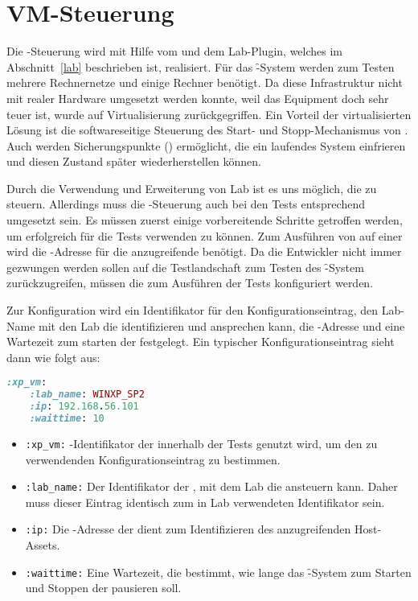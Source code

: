 \section{VM-Steuerung}
\label{sec:test_vm_control}
\authors{\DH \and \LM}{\MW \and \JF}

Die -Steuerung wird mit Hilfe vom 
und dem Lab-Plugin, welches im Abschnitt~\ref{lab} beschrieben ist,
realisiert. Für das \f-System werden zum Testen mehrere
Rechnernetze und einige Rechner benötigt. Da diese Infrastruktur nicht
mit realer Hardware umgesetzt werden konnte, weil das Equipment doch
sehr teuer ist, wurde auf Virtualisierung zurückgegriffen. Ein Vorteil
der virtualisierten Lösung ist die softwareseitige Steuerung des
Start- und Stopp-Mechanismus von . Auch werden
Sicherungspunkte () ermöglicht, die ein laufendes System
einfrieren und diesen Zustand später wiederherstellen können.

Durch die Verwendung und Erweiterung von Lab ist es uns möglich, die 
zu steuern. Allerdings muss die -Steuerung auch bei den Tests
entsprechend umgesetzt sein. Es müssen zuerst einige vorbereitende Schritte
getroffen werden, um  erfolgreich für die Tests verwenden zu können. 
Zum Ausführen von  auf einer  wird \zB die 
-Adresse für die anzugreifende  benötigt. Da die Entwickler 
nicht immer gezwungen werden sollen auf die Testlandschaft zum Testen des 
\f-System zurückzugreifen, müssen die  zum Ausführen der Tests 
konfiguriert werden.

Zur Konfiguration wird ein Identifikator für den Konfigurationseintrag,
den Lab-Name mit den Lab die  identifizieren und ansprechen kann, die
-Adresse und eine Wartezeit zum starten der  festgelegt.
Ein typischer Konfigurationseintrag sieht dann wie folgt aus:

\begin{lstlisting}[language=Ruby]
  :xp_vm: 
    :lab_name: WINXP_SP2
    :ip: 192.168.56.101
    :waittime: 10
\end{lstlisting}

\begin{itemize}
  \item \texttt{:xp\_vm:} -Identifikator der innerhalb der Tests
      genutzt wird, um den zu verwendenden Konfigurationseintrag zu bestimmen.
  \item \texttt{:lab\_name:} Der Identifikator der , mit dem Lab
      die  ansteuern kann. Daher muss dieser Eintrag identisch zum in
      Lab verwendeten Identifikator sein.
  \item \texttt{:ip:} Die -Adresse der  dient zum
      Identifizieren des anzugreifenden Host-Assets.
  \item \texttt{:waittime:} Eine Wartezeit, die bestimmt, wie lange das
      \f-System zum Starten und Stoppen der  pausieren soll.
\end{itemize}

